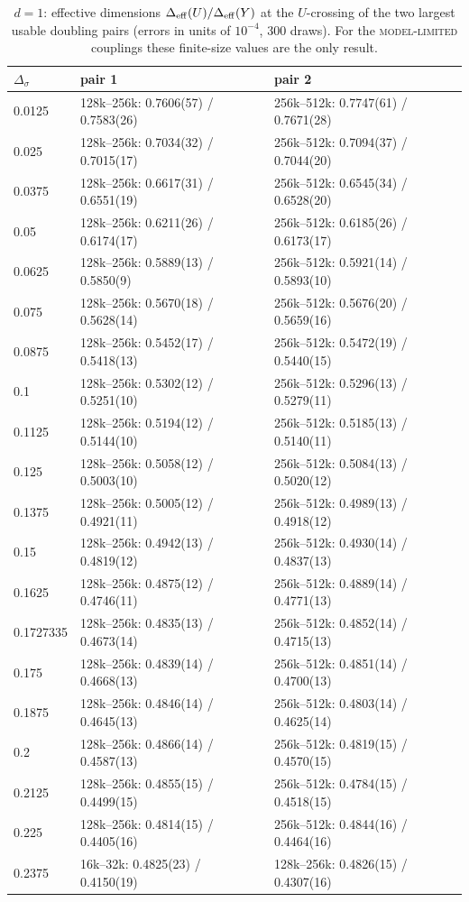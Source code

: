 \documentclass[10pt,a4paper]{article}
\newcommand{\Ds}{\Delta_\sigma}
\newcommand{\Deff}{\Delta_{\rm eff}}
\newcommand{\lbl}[1]{{\mdseries\scshape #1}}
\begin{document}
\begin{table}[htbp]\centering\scriptsize
\caption{$d=1$: effective dimensions $\Deff(U)/\Deff(Y)$ at the $U$-crossing of the two largest usable doubling pairs (errors in units of
$10^{-4}$, 300 draws). For the \lbl{model-limited} couplings these finite-size values are the only result.}\label{tab:1dpairs}
\begin{tabular}{@{}lll@{}}\toprule
$\Ds$ & pair 1 & pair 2 \\\midrule
0.0125 & 128k--256k: 0.7606(57) / 0.7583(26) & 256k--512k: 0.7747(61) / 0.7671(28) \\
0.025 & 128k--256k: 0.7034(32) / 0.7015(17) & 256k--512k: 0.7094(37) / 0.7044(20) \\
0.0375 & 128k--256k: 0.6617(31) / 0.6551(19) & 256k--512k: 0.6545(34) / 0.6528(20) \\
0.05 & 128k--256k: 0.6211(26) / 0.6174(17) & 256k--512k: 0.6185(26) / 0.6173(17) \\
0.0625 & 128k--256k: 0.5889(13) / 0.5850(9) & 256k--512k: 0.5921(14) / 0.5893(10) \\
0.075 & 128k--256k: 0.5670(18) / 0.5628(14) & 256k--512k: 0.5676(20) / 0.5659(16) \\
0.0875 & 128k--256k: 0.5452(17) / 0.5418(13) & 256k--512k: 0.5472(19) / 0.5440(15) \\
0.1 & 128k--256k: 0.5302(12) / 0.5251(10) & 256k--512k: 0.5296(13) / 0.5279(11) \\
0.1125 & 128k--256k: 0.5194(12) / 0.5144(10) & 256k--512k: 0.5185(13) / 0.5140(11) \\
0.125 & 128k--256k: 0.5058(12) / 0.5003(10) & 256k--512k: 0.5084(13) / 0.5020(12) \\
0.1375 & 128k--256k: 0.5005(12) / 0.4921(11) & 256k--512k: 0.4989(13) / 0.4918(12) \\
0.15 & 128k--256k: 0.4942(13) / 0.4819(12) & 256k--512k: 0.4930(14) / 0.4837(13) \\
0.1625 & 128k--256k: 0.4875(12) / 0.4746(11) & 256k--512k: 0.4889(14) / 0.4771(13) \\
0.1727335 & 128k--256k: 0.4835(13) / 0.4673(14) & 256k--512k: 0.4852(14) / 0.4715(13) \\
0.175 & 128k--256k: 0.4839(14) / 0.4668(13) & 256k--512k: 0.4851(14) / 0.4700(13) \\
0.1875 & 128k--256k: 0.4846(14) / 0.4645(13) & 256k--512k: 0.4803(14) / 0.4625(14) \\
0.2 & 128k--256k: 0.4866(14) / 0.4587(13) & 256k--512k: 0.4819(15) / 0.4570(15) \\
0.2125 & 128k--256k: 0.4855(15) / 0.4499(15) & 256k--512k: 0.4784(15) / 0.4518(15) \\
0.225 & 128k--256k: 0.4814(15) / 0.4405(16) & 256k--512k: 0.4844(16) / 0.4464(16) \\
0.2375 & 16k--32k: 0.4825(23) / 0.4150(19) & 128k--256k: 0.4826(15) / 0.4307(16) \\
\bottomrule\end{tabular}
\end{table}
\end{document}
